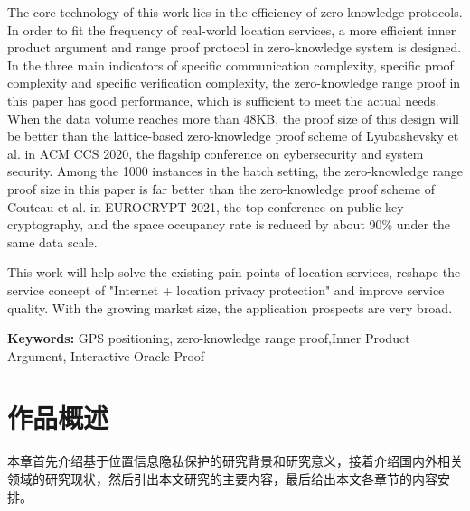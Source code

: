 \documentclass[zihao=-4]{ctexart}
\newcommand{\xiaowu}{\fontsize{9pt}{0}}
\begin{document}
\begin{spacing}{1.5}
\begin{adjustwidth}{0.42cm}{0.42cm}
The core technology of this work lies in the efficiency of zero-knowledge protocols. In order to fit the frequency of real-world location services, a more efficient inner product argument and range proof protocol in zero-knowledge system is designed. In the three main indicators of specific communication complexity, specific proof complexity and specific verification complexity, the zero-knowledge range proof in this paper has good performance, which is sufficient to meet the actual needs. When the data volume reaches more than 48KB, the proof size of this design will be better than the lattice-based zero-knowledge proof scheme of Lyubashevsky et al. in ACM CCS 2020, the flagship conference on cybersecurity and system security. Among the 1000 instances in the batch setting, the zero-knowledge range proof size in this paper is far better than the zero-knowledge proof scheme of Couteau et al. in EUROCRYPT 2021, the top conference on public key cryptography, and the space occupancy rate is reduced by about 90\% under the same data scale.\par
This work will help solve the existing pain points of location services, reshape the service concept of "Internet + location privacy protection" and improve service quality. With the growing market size, the application prospects are very broad.\par
\textbf{Keywords: }GPS positioning, zero-knowledge range proof,Inner Product Argument, Interactive Oracle Proof
\end{adjustwidth}
\end{spacing}





\clearpage
\tableofcontents
\clearpage



\renewcommand{\headrulewidth}{0.4pt} %

\chead{\xiaowu 北京航空航天大学第三十三届“冯如杯”竞赛主赛道参赛作品} %

\setcounter{page}{1} 




\section{作品概述}
本章首先介绍基于位置信息隐私保护的研究背景和研究意义，接着介绍国内外相关领域的研究现状，然后引出本文研究的主要内容，最后给出本文各章节的内容安排。
\end{document}
